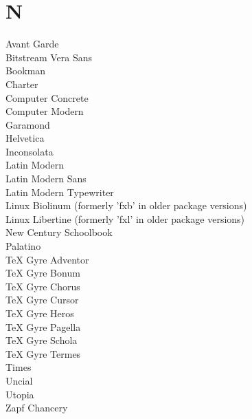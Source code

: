 \documentclass[12pt,a4paper]{report}
\begin{document}
    \section{N}

     Avant Garde \\
     Bitstream Vera Sans \\
     Bookman \\
     Charter \\
     Computer Concrete \\
     Computer Modern \\
     Garamond \\
     Helvetica \\
     Inconsolata \\
     Latin Modern \\
     Latin Modern Sans \\
     Latin Modern Typewriter \\
     Linux Biolinum (formerly 'fxb' in older package versions) \\
     Linux Libertine (formerly 'fxl' in older package versions) \\
     New Century Schoolbook \\
     Palatino \\
     TeX Gyre Adventor \\ 
     TeX Gyre Bonum \\
     TeX Gyre Chorus \\
     TeX Gyre Cursor \\
     TeX Gyre Heros \\
     TeX Gyre Pagella \\
     TeX Gyre Schola \\
     TeX Gyre Termes \\
     Times \\
     Uncial \\
     Utopia \\ 
     Zapf Chancery \\

    
\end{document}
